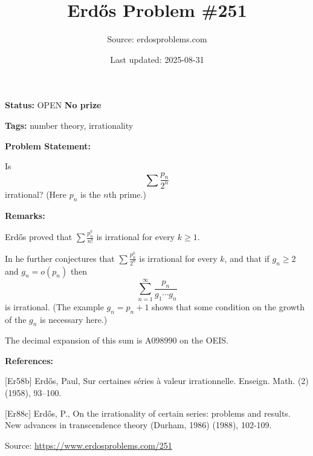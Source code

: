 \documentclass{article}
\title{Erd\H{o}s Problem \#251}
\date{Last updated: 2025-08-31}
\author{Source: erdosproblems.com}
\begin{document}
\maketitle

\noindent\textbf{Status:} OPEN \quad \textbf{No prize}

\noindent\textbf{Tags:} number theory, irrationality

\medskip
\noindent\textbf{Problem Statement:}

Is\[\sum \frac{p_n}{2^n}\]irrational? (Here $p_n$ is the $n$th prime.)

\bigskip
\noindent\textbf{Remarks:}

Erd\H{o}s \cite{Er58b} proved that $\sum \frac{p_n^k}{n!}$ is irrational for every $k\geq 1$.

In \cite{Er88c} he further conjectures that $\sum \frac{p_n^k}{2^n}$ is irrational for every $k$, and that if $g_n\geq 2$ and $g_n=o(p_n)$ then\[\sum_{n=1}^\infty \frac{p_n}{g_1\cdots g_n}\]is irrational. (The example $g_n=p_n+1$ shows that some condition on the growth of the $g_n$ is necessary here.)

The decimal expansion of this sum is A098990 on the OEIS.

\bigskip
\noindent\textbf{References:}

[Er58b] Erd\H{o}s, Paul, Sur certaines s\'{e}ries \`a{} valeur irrationnelle. Enseign. Math. (2) (1958), 93--100.
 
 [Er88c] Erd\H{o}s, P., On the irrationality of certain series: problems and results. New advances in transcendence theory (Durham, 1986) (1988), 102-109.

\bigskip
\noindent\small{Source: \url{https://www.erdosproblems.com/251}}
\end{document}

